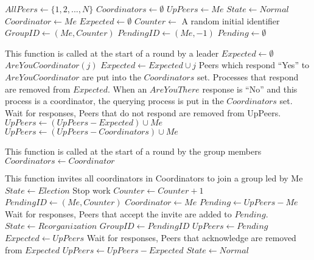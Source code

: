 \begin{algorithmic}[1]
\small
\State $AllPeers \gets \{ 1, 2, ..., N \}$
\State $Coordinators \gets \emptyset$
\State $UpPeers \gets { Me }$
\State $State \gets Normal$
\State $Coordinator \gets Me$
\State $Expected \gets \emptyset$
\State $Counter \gets$ A random initial identifier
\State $GroupID \gets (Me,Counter)$
\State $PendingID \gets (Me, -1)$
\State $Pending \gets \emptyset$

\State

    \State This function is called at the start of a round by a leader
        \Return
    \EndIf
    \State $Expected \gets \emptyset$
        \State $AreYouCoordinator(j)$
        \State $Expected \gets Expected \cup j$
    \EndFor
    \State Peers which respond ``Yes'' to $AreYouCoordinator$ are put into the $Coordinators$ set.
    \State Processes that respond are removed from $Expected$.
    \State When an $AreYouThere$ response is ``No'' and this process is a coordinator, the querying process is put in the $Coordinators$ set.
    \State Wait for responses, Peers that do not respond are removed from UpPeers.
    \State $UpPeers \gets (UpPeers-Expected) \cup {Me}$
    \State $UpPeers \gets (UpPeers-Coordinators) \cup {Me}$
        \Return
    \EndIf
        \State
    \EndIf
\EndFunction

\State

    \State This function is called at the start of a round by the group members
        \Return
    \Else
			\State $Coordinators \gets Coordinator$
        \EndIf
    \EndIf
\EndFunction

\State

    \State This function invites all coordinators in Coordinators to join a group led by Me
    \State $State \gets Election$
    \State Stop work
    \State $Counter \gets Counter+1$
    \State $PendingID \gets (Me,Counter)$
    \State $Coordinator \gets Me$
    \State $Pending \gets UpPeers - {Me}$
    \EndFor
    \State Wait for responses, Peers that accept the invite are added to $Pending$.
    \State $State \gets Reorganization$
	\State $GroupID \gets PendingID$
	\State $UpPeers \gets Pending$
    \EndFor
    \State $Expected \gets UpPeers$
    \State Wait for responses, Peers that acknowledge are removed from $Expected$
    \State $UpPeers \gets UpPeers - Expected$
    \State $State \gets Normal$
\EndFunction


\end{algorithmic}
